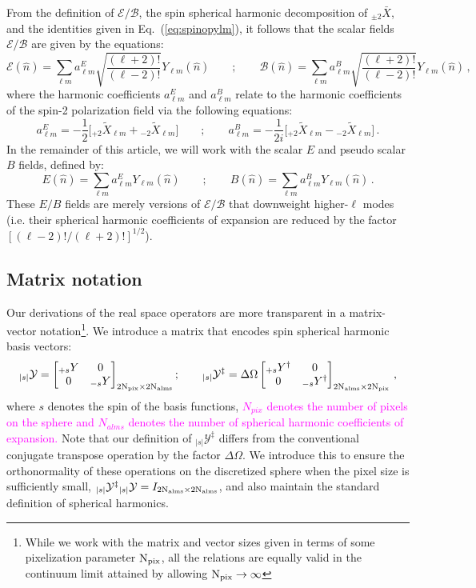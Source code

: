 \documentclass[a4paper,11pt]{article}
\newcommand{\beq}{\begin{equation}}
\newcommand{\eeq}{\end{equation}}
\newcommand{\bmat}{\begin{bmatrix}}
\newcommand{\emat}{\end{bmatrix}}
\def\eq#1{{Eq.~(\ref{#1})}}
\newcommand{\addtext}{\textcolor{magenta}  }
\begin{document}
From the definition of $\mathcal{E/B}$, the spin spherical harmonic decomposition of ${}_{\pm2}\bar{X}$, and the identities given in \eq{eq:spinopylm}, it follows that the scalar fields $\mathcal{E}/\mathcal{B}$ are given by the equations:
%
\beq \label{eq:pseudo}
\mathcal{E}(\hat{n}) = \sum_{\ell m} a^{E}_{\ell m} \sqrt{\frac{(\ell+2)!}{(\ell-2)!}} Y_{\ell m} (\hat{n})\qquad;\qquad
\mathcal{B}(\hat{n})  =\sum_{\ell m} a^{B}_{\ell m} \sqrt{\frac{(\ell+2)!}{(\ell-2)!}} Y_{\ell m} (\hat{n}) \,,
\eeq
%
where the harmonic coefficients $a^{E}_{\ell m}$ and  $a^{B}_{\ell m}$ relate to the harmonic coefficients of the spin-2 polarization field via the following equations:
%
\beq\label{eq:x2eb}
a^{E}_{\ell m} = -\frac{1}{2} \Big[ {}_{+2}\tilde{X}_{\ell m} + {}_{-2}\tilde{X}_{\ell m} \Big]\qquad;\qquad a^{B}_{\ell m} = -\frac{1}{2i} \Big[ {}_{+2}\tilde{X}_{\ell m} - {}_{-2}\tilde{X}_{\ell m} \Big] \,.
\eeq
%
In the remainder of this article, we will work with the scalar $E$ and pseudo scalar $B$ fields, defined by: 
%
\beq \label{eq:realeb}
E(\hat{n}) = \sum_{\ell m} a^{E}_{\ell m} Y_{\ell m} (\hat{n})\qquad;\qquad B(\hat{n})  =\sum_{\ell m} a^{B}_{\ell m} Y_{\ell m} (\hat{n}) \,.
\eeq
%
These $E/B$ fields are merely versions of $\mathcal{E}/\mathcal{B}$ that downweight higher-$\ell$ modes  (i.e. their spherical harmonic coefficients of expansion are reduced by the factor $[{(\ell-2)!}/{(\ell+2)!}]^{1/2}$).

\subsection{Matrix notation} \label{sec:mat_pol_intro}
Our derivations of the real space operators are more transparent in a matrix-vector notation\footnote{While we work with the matrix and vector sizes given in terms of some pixelization parameter $\rm N_{\rm pix}$, all the relations are equally valid in the continuum limit attained by allowing $\rm N_{\rm pix}\rightarrow \infty$}. We introduce a matrix that encodes spin spherical harmonic basis vectors:
%
\beq
{}_{|s|}\mathcal{Y}= \bmat _{+s}Y & 0 \\ 0 & _{-s}Y \emat _{2 \rm N_{\rm pix} \times 2 \rm N_{\rm alms}} ;\qquad  {}_{|s|}\mathcal{Y}^{\ddagger}= \Delta \Omega \bmat _{+s}Y^{\dagger} & 0 \\ 0 & _{-s}Y^{\dagger} \emat _{2 \rm N_{\rm alms} \times 2 \rm N_{\rm pix}} \,,
\eeq
%
where $s$ denotes the spin of the basis functions, \addtext{$N_{pix}$ denotes the number of pixels on the sphere and $N_{alms}$ denotes the number of spherical harmonic coefficients of expansion.} %
Note that our definition of ${}_{|s|}\mathcal{Y}^{\ddagger}$ differs from the conventional conjugate transpose operation by the factor $\Delta \Omega$.  We introduce this to ensure the orthonormality of these operations on the discretized sphere when the pixel size is sufficiently small, ${}_{|s|}\mathcal{Y}^{\ddagger} {}_{|s|}\mathcal{Y} = I_{2 \rm N_{\rm alms} \times2 \rm N_{\rm alms}}$, and also maintain the standard definition of spherical harmonics. 
\end{document}
